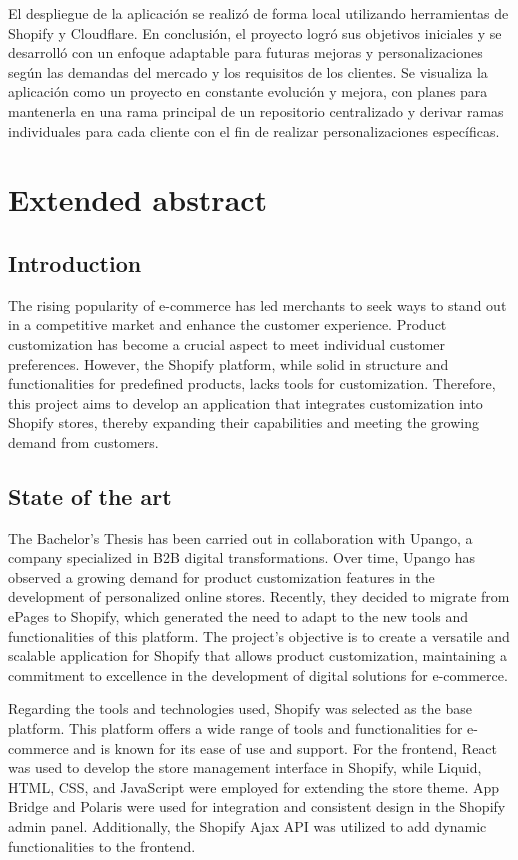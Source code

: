 \documentclass[11pt]{article}
\begin{document}
El despliegue de la aplicación se realizó de forma local utilizando herramientas de Shopify y Cloudflare. En conclusión, el proyecto logró sus 
objetivos iniciales y se desarrolló con un enfoque adaptable para futuras mejoras y personalizaciones según las demandas del mercado y los 
requisitos de los clientes. Se visualiza la aplicación como un proyecto en constante evolución y mejora, con planes para mantenerla en una 
rama principal de un repositorio centralizado y derivar ramas individuales para cada cliente con el fin de realizar personalizaciones específicas.

\clearpage

\section{Extended abstract}

\subsection{Introduction}
The rising popularity of e-commerce has led merchants to seek ways to stand out in a competitive market and enhance the customer experience.
Product customization has become a crucial aspect to meet individual customer preferences. However, the Shopify platform, while solid in 
structure and functionalities for predefined products, lacks tools for customization. Therefore, this project aims to develop an application 
that integrates customization into Shopify stores, thereby expanding their capabilities and meeting the growing demand from customers.

\subsection{State of the art}
The Bachelor's Thesis has been carried out in collaboration with Upango, a company specialized in B2B digital transformations. Over time,
Upango has observed a growing demand for product customization features in the development of personalized online stores. Recently, they decided
to migrate from ePages to Shopify, which generated the need to adapt to the new tools and functionalities of this platform. The project's objective 
is to create a versatile and scalable application for Shopify that allows product customization, maintaining a commitment to excellence in the development
of digital solutions for e-commerce.

Regarding the tools and technologies used, Shopify was selected as the base platform. This platform offers a wide range of tools and functionalities 
for e-commerce and is known for its ease of use and support. For the frontend, React was used to develop the store management interface in Shopify, 
while Liquid, HTML, CSS, and JavaScript were employed for extending the store theme. App Bridge and Polaris were used for integration and consistent 
design in the Shopify admin panel. Additionally, the Shopify Ajax API was utilized to add dynamic functionalities to the frontend.
\end{document}
